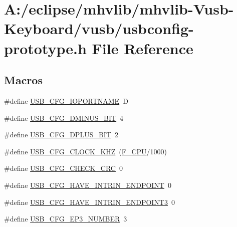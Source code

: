 \hypertarget{mhvlib-_vusb-_keyboard_2vusb_2usbconfig-prototype_8h}{\section{A\-:/eclipse/mhvlib/mhvlib-\/\-Vusb-\/\-Keyboard/vusb/usbconfig-\/prototype.h File Reference}
\label{mhvlib-_vusb-_keyboard_2vusb_2usbconfig-prototype_8h}
}
\subsection*{Macros}
\begin{DoxyCompactItemize}
\item 
\#define \hyperlink{mhvlib-_vusb-_keyboard_2vusb_2usbconfig-prototype_8h_a98ed17962b55543b35e10ae1f8ebe09b}{U\-S\-B\-\_\-\-C\-F\-G\-\_\-\-I\-O\-P\-O\-R\-T\-N\-A\-M\-E}~D
\item 
\#define \hyperlink{mhvlib-_vusb-_keyboard_2vusb_2usbconfig-prototype_8h_a3a8bf6679cd70d1ddcc05024ffef9922}{U\-S\-B\-\_\-\-C\-F\-G\-\_\-\-D\-M\-I\-N\-U\-S\-\_\-\-B\-I\-T}~4
\item 
\#define \hyperlink{mhvlib-_vusb-_keyboard_2vusb_2usbconfig-prototype_8h_a3005cdbb03c707af8007363632d7d02d}{U\-S\-B\-\_\-\-C\-F\-G\-\_\-\-D\-P\-L\-U\-S\-\_\-\-B\-I\-T}~2
\item 
\#define \hyperlink{mhvlib-_vusb-_keyboard_2vusb_2usbconfig-prototype_8h_a9bf12dabd0e5186299ed0f13cd00dfeb}{U\-S\-B\-\_\-\-C\-F\-G\-\_\-\-C\-L\-O\-C\-K\-\_\-\-K\-H\-Z}~(\hyperlink{mhvlib-_vusb-_console_2vusb_2oddebug_8h_a43bafb28b29491ec7f871319b5a3b2f8}{F\-\_\-\-C\-P\-U}/1000)
\item 
\#define \hyperlink{mhvlib-_vusb-_keyboard_2vusb_2usbconfig-prototype_8h_a57122aa75d9b598adcd238aee5f2b4b7}{U\-S\-B\-\_\-\-C\-F\-G\-\_\-\-C\-H\-E\-C\-K\-\_\-\-C\-R\-C}~0
\item 
\#define \hyperlink{mhvlib-_vusb-_keyboard_2vusb_2usbconfig-prototype_8h_afe176bba6f05a034a5eec11f7ed6302b}{U\-S\-B\-\_\-\-C\-F\-G\-\_\-\-H\-A\-V\-E\-\_\-\-I\-N\-T\-R\-I\-N\-\_\-\-E\-N\-D\-P\-O\-I\-N\-T}~0
\item 
\#define \hyperlink{mhvlib-_vusb-_keyboard_2vusb_2usbconfig-prototype_8h_a973c0b60531876ba52c4447e0fd0a150}{U\-S\-B\-\_\-\-C\-F\-G\-\_\-\-H\-A\-V\-E\-\_\-\-I\-N\-T\-R\-I\-N\-\_\-\-E\-N\-D\-P\-O\-I\-N\-T3}~0
\item 
\#define \hyperlink{mhvlib-_vusb-_keyboard_2vusb_2usbconfig-prototype_8h_a6ba1def233ee0e102febe80e53af53a7}{U\-S\-B\-\_\-\-C\-F\-G\-\_\-\-E\-P3\-\_\-\-N\-U\-M\-B\-E\-R}~3

\end{DoxyCompactItemize}
